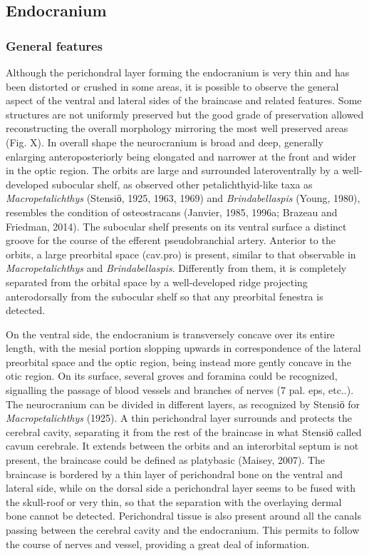 \documentclass[12pt,letterpaper]{article}
\begin{document}
\subsection{Endocranium}
\subsubsection{General features}
Although the perichondral layer forming the endocranium is very thin and has been distorted or crushed in some areas, it is possible to observe the general aspect of the ventral and lateral sides of the braincase and related features. Some structures are not uniformly preserved but the good grade of preservation allowed reconstructing the overall morphology mirroring the most well preserved areas (Fig. X). 
In overall shape the neurocranium is broad and deep, generally enlarging anteroposteriorly being elongated and narrower at the front and wider in the optic region. The orbits are large and surrounded lateroventrally by a well-developed subocular shelf, as observed other petalichthyid-like taxa as \textit{Macropetalichthys} (Stensiӧ, 1925, 1963, 1969) and \textit{Brindabellaspis} (Young, 1980), resembles the condition of osteostracans (Janvier, 1985, 1996a; Brazeau and Friedman, 2014). The subocular shelf presents on its ventral surface a distinct groove for the course of the efferent pseudobranchial artery. Anterior to the orbits, a large preorbital space (cav.pro) is present, similar to that observable in \textit{Macropetalichthys} and \textit{Brindabellaspis}. Differently from them, it is completely separated from the orbital space by a well-developed ridge projecting anterodorsally from the subocular shelf so that any preorbital fenestra is detected. 

On the ventral side, the endocranium is transversely concave over its entire length, with the mesial portion slopping upwards in correspondence of the lateral preorbital space and the optic region, being instead more gently concave in the otic region. On its surface, several groves and foramina could be recognized, signalling the passage of blood vessels and branches of nerves (7 pal. eps, etc..). 
The neurocranium can be divided in different layers, as recognized by Stensiӧ for \textit{Macropetalichthys} (1925). A thin perichondral layer surrounds and protects the cerebral cavity, separating it from the rest of the braincase in what Stensiӧ called cavum cerebrale. It extends between the orbits and an interorbital septum is not present, the braincase could be defined as platybasic (Maisey, 2007). The braincase is bordered by a thin layer of perichondral bone on the ventral and lateral side, while on the dorsal side a perichondral layer seems to be fused with the skull-roof or very thin, so that the separation with the overlaying dermal bone cannot be detected. Perichondral tissue is also present around all the canals passing between the cerebral cavity and the endocranium. This permits to follow the course of nerves and vessel, providing a great deal of information. 
\end{document}
